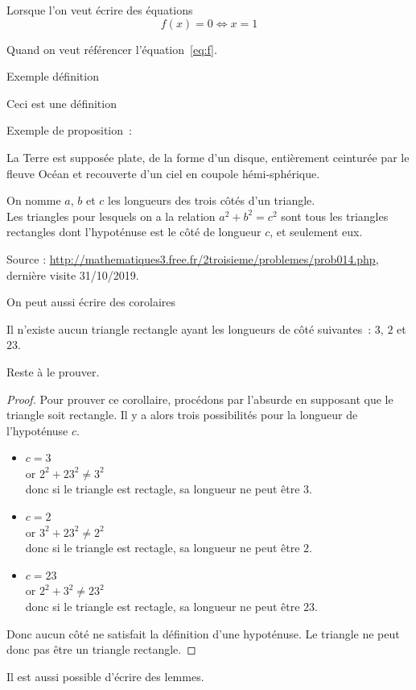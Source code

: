 \documentclass[francais]{rapportPFE}  %
\begin{document}
Lorsque l'on veut écrire des équations
\begin{equation}
\label{eq:f}
   f(x) = 0 \iff x = 1
\end{equation}

Quand on veut référencer l'équation~\ref{eq:f}.

Exemple définition
\begin{Definition}
\label{def:troll}
Ceci est une définition
\end{Definition}

Exemple de proposition~:
\begin{Proposition}
\label{prop:f}
La Terre est supposée plate, de la forme d'un disque, entièrement ceinturée par le fleuve Océan et recouverte d'un ciel en coupole hémi-sphérique.
\end{Proposition}

\begin{Theorem}
\label{Th:Pythagore}
On nomme $a$, $b$ et $c$ les longueurs des trois côtés d'un triangle.\\
Les triangles pour lesquels on a la relation $a^{2}+ b^{2} = c^{2}$ sont tous les triangles rectangles dont l'hypoténuse est le côté de longueur $c$, et seulement eux.

Source : \url{http://mathematiques3.free.fr/2troisieme/problemes/prob014.php}, dernière visite 31/10/2019.
\end{Theorem}

On peut aussi écrire des corolaires
\begin{Corollary}[]
\label{Cor:TriangleImpossible}
Il n'existe aucun triangle rectangle ayant les longueurs de côté suivantes~: $3$, $2$ et $23$.
\end{Corollary}

Reste à le prouver.
\begin{proof}
Pour prouver ce corollaire, procédons par l'absurde en supposant que le triangle soit rectangle. Il y a alors trois possibilités pour la longueur de l'hypoténuse $c$. 
\begin{itemize}
\item $c=3$\\
or $2^{2}+ 23^{2} \neq 3^{2}$\\
donc si le triangle est rectagle, sa longueur ne peut être $3$.
\item $c=2$\\
or $3^{2}+ 23^{2} \neq 2^{2}$\\
donc si le triangle est rectagle, sa longueur ne peut être $2$.
\item $c=23$\\
or $2^{2}+ 3^{2} \neq 23^{2}$\\
donc si le triangle est rectagle, sa longueur ne peut être $23$.
\end{itemize}
Donc aucun côté ne satisfait la définition d'une hypoténuse. Le triangle ne peut donc pas être un triangle rectangle.
\end{proof}
Il est aussi possible d'écrire des lemmes. 
\end{document}
